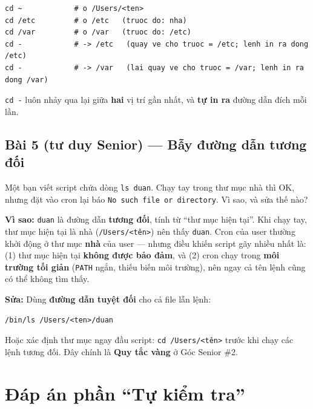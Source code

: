 \documentclass[12pt,a4paper]{article}
\begin{document}
\begin{notebox}[title={Đáp án}]
\begin{codebox}
\begin{verbatim}
cd ~            # o /Users/<ten>
cd /etc         # o /etc   (truoc do: nha)
cd /var         # o /var   (truoc do: /etc)
cd -            # -> /etc   (quay ve cho truoc = /etc; lenh in ra dong /etc)
cd -            # -> /var   (lai quay ve cho truoc = /var; lenh in ra dong /var)
\end{verbatim}
\end{codebox}
\texttt{cd -} luôn nhảy qua lại giữa \textbf{hai} vị trí gần nhất, và \textbf{tự in ra} đường dẫn đích mỗi lần.
\end{notebox}

\subsection{Bài 5 (tư duy Senior) --- Bẫy đường dẫn tương đối}
Một bạn viết script chứa dòng \texttt{ls duan}. Chạy tay trong thư mục nhà thì OK, nhưng đặt vào cron lại báo \texttt{No such file or directory}. Vì sao, và sửa thế nào?

\begin{notebox}[title={Đáp án}]
\textbf{Vì sao:} \texttt{duan} là đường dẫn \textbf{tương đối}, tính từ ``thư mục hiện tại''. Khi chạy tay, thư mục hiện tại là nhà (\texttt{/Users/<tên>}) nên thấy \texttt{duan}. Cron của user thường khởi động ở thư mục \textbf{nhà} của user --- nhưng điều khiến script gãy nhiều nhất là: (1) thư mục hiện tại \textbf{không được bảo đảm}, và (2) cron chạy trong \textbf{môi trường tối giản} (\texttt{PATH} ngắn, thiếu biến môi trường), nên ngay cả tên lệnh cũng có thể không tìm thấy.

\vspace{0.4em}
\textbf{Sửa:} Dùng \textbf{đường dẫn tuyệt đối} cho cả file lẫn lệnh:
\begin{codebox}
\begin{verbatim}
/bin/ls /Users/<ten>/duan
\end{verbatim}
\end{codebox}
Hoặc xác định thư mục ngay đầu script: \texttt{cd /Users/<tên>} trước khi chạy các lệnh tương đối. Đây chính là \textbf{Quy tắc vàng} ở Góc Senior \#2.
\end{notebox}

\section{Đáp án phần ``Tự kiểm tra''}
\end{document}
